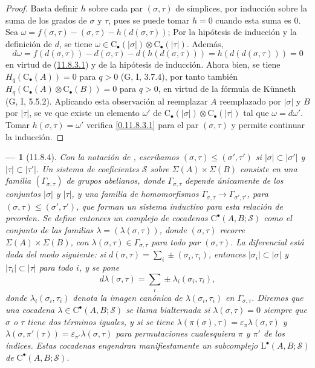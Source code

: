 \documentclass[10pt,oneside,openany]{book}
\theoremstyle{egaenv}\newtheorem*{env}{---}
\theoremstyle{egastatement}
\theoremstyle{egadescription}
\renewcommand{\leq}{\leqslant}
\begin{document}
\begin{proof}
Basta definir $h$ sobre cada par $(\sigma,\tau)$ de símplices, por
inducción sobre la suma de los grados de $\sigma$ y $\tau$, pues se puede tomar $h=0$ cuando esta suma es $0$. Sea
$\omega=f(\sigma,\tau)-(\sigma,\tau)-h(d(\sigma,\tau))$;
Por la hipótesis de inducción y la definición de $d$, se tiene
$\omega\in\mathrm C_\bullet(|\sigma|)\otimes\mathrm C_\bullet(|\tau|)$.
Además,
\[
d\omega=f(d(\sigma,\tau))-d(\sigma,\tau)-d(h(d(\sigma,\tau)))
=h(d(d(\sigma,\tau)))=0
\]
en virtud de (\hyperref[0.11.8.3.1-fr]{11.8.3.1}) y de la hipótesis de inducción. Ahora bien, se tiene $H_q(\mathrm C_\bullet(A))=0$ para $q>0$ (G, I, 3.7.4), por tanto también $H_q(\mathrm C_\bullet(A)\otimes\mathrm C_\bullet(B))=0$ para $q>0$, en virtud de la fórmula de Künneth (G, I, 5.5.2). Aplicando esta observación al reemplazar $A$ reemplazado por $|\sigma|$ y $B$ por
$|\tau|$, se ve que existe un elemento $\omega'$ de $\mathrm C_\bullet(|\sigma|)\otimes\mathrm C_\bullet(|\tau|)$ tal que $\omega=d\omega'$.
Tomar $h(\sigma,\tau)=\omega'$ verifica \eqref{0.11.8.3.1} para el par
$(\sigma,\tau)$ y permite continuar la inducción.
\end{proof}

\begin{env}[11.8.4]
\label{0.11.8.4}
\label{0.11.8.4-fr}
Con la notación de , escribamos
$(\sigma,\tau)\leq(\sigma',\tau')$
si $|\sigma|\subset|\sigma'|$ y $|\tau|\subset|\tau'|$.
Un \emph{sistema de coeficientes} $\mathscr S$ sobre
$\Sigma(A)\times\Sigma(B)$ consiste en una familia
$(\Gamma_{\sigma,\tau})$ de grupos abelianos, donde
$\Gamma_{\sigma,\tau}$ depende únicamente de los conjuntos $|\sigma|$ y
$|\tau|$, y una familia de homomorfismos $\Gamma_{\sigma,\tau}\longrightarrow\Gamma_{\sigma',\tau'}$, para $(\sigma,\tau)\leq(\sigma',\tau')$, que forman un \emph{sistema inductivo} para esta relación de preorden. Se define entonces un \emph{complejo de cocadenas} $\mathrm C^\bullet(A,B;\mathscr S)$ como el conjunto de las familias $\lambda=(\lambda(\sigma,\tau))$, donde $(\sigma,\tau)$ recorre $\Sigma(A)\times\Sigma(B)$, con $\lambda(\sigma,\tau)\in\Gamma_{\sigma,\tau}$ para todo par $(\sigma,\tau)$. La diferencial está dada del modo siguiente: si
$d(\sigma,\tau)=\sum_i\pm(\sigma_i,\tau_i)$,
entonces $|\sigma_i|\subset|\sigma|$ y $|\tau_i|\subset|\tau|$ para todo
$i$, y se pone
\[
d\lambda(\sigma,\tau)=\sum_i\pm\lambda_i(\sigma_i,\tau_i),
\]
donde $\lambda_i(\sigma_i,\tau_i)$ denota la imagen canónica de
$\lambda(\sigma_i,\tau_i)$ en $\Gamma_{\sigma,\tau}$. Diremos que una cocadena $\lambda\in\mathrm C^\bullet(A,B;\mathscr S)$ se llama
\emph{bialternada} si $\lambda(\sigma,\tau)=0$ siempre que $\sigma$
o $\tau$ tiene dos términos iguales, y si se tiene $\lambda(\pi(\sigma),\tau)=\varepsilon_\pi\lambda(\sigma,\tau)$ y $\lambda(\sigma,\pi'(\tau))=\varepsilon_{\pi'}\lambda(\sigma,\tau)$ para permutaciones cualesquiera $\pi$ y $\pi'$ de los índices.
Estas cocadenas engendran manifiestamente un \emph{subcomplejo}
$\mathrm L^\bullet(A,B;\mathscr S)$ de
$\mathrm C^\bullet(A,B;\mathscr S)$.
\end{env}
\end{document}
